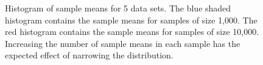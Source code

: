 \documentclass[singlepage,notitlepage,nofootinbib,11pt]{revtex4-1}
\begin{document}
\begin{figure}[h]
\hfill
  \caption{\label{histos} Histogram of sample means for 5 data sets. The blue shaded histogram contains the sample means for samples of size 1,000. The red histogram contains the sample means for samples of size 10,000. Increasing the number of sample means in each sample has the expected effect of narrowing the distribution.}
\end{figure}
\clearpage
\end{document}
